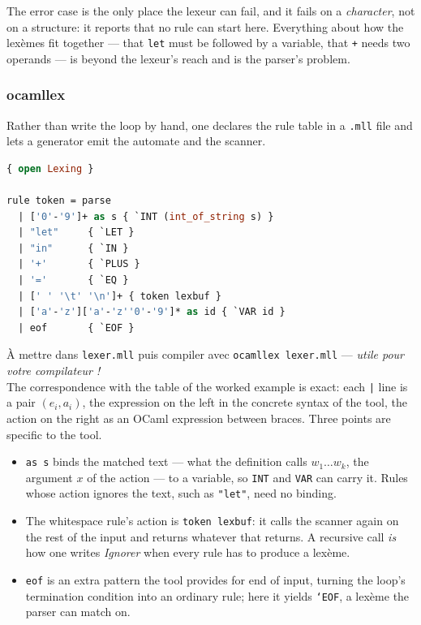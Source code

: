 \begin{remark}
  The error case is the only place the lexeur can fail, and it fails on a
  \emph{character}, not on a structure: it reports that no rule can start here.
  Everything about how the lexèmes fit together --- that \texttt{let} must be
  followed by a variable, that \texttt{+} needs two operands --- is beyond the
  lexeur's reach and is the parser's problem.
\end{remark}

\subsubsection{ocamllex}
Rather than write the loop by hand, one declares the rule table in a
\texttt{.mll} file and lets a generator emit the automate and the scanner.

\begin{lstlisting}[language=Caml]
{ open Lexing }

rule token = parse
  | ['0'-'9']+ as s { `INT (int_of_string s) }
  | "let"     { `LET }
  | "in"      { `IN }
  | '+'       { `PLUS }
  | '='       { `EQ }
  | [' ' '\t' '\n']+ { token lexbuf }
  | ['a'-'z']['a'-'z''0'-'9']* as id { `VAR id }
  | eof       { `EOF }
\end{lstlisting}

À mettre dans \texttt{lexer.mll} puis compiler avec \texttt{ocamllex lexer.mll}
--- \emph{utile pour votre compilateur !}\\

The correspondence with the table of the worked example is exact: each
\texttt{|} line is a pair $(e_i, a_i)$, the expression on the left in the
concrete syntax of the tool, the action on the right as an OCaml expression
between braces. Three points are specific to the tool.

\begin{itemize}
  \item \verb|as s| binds the matched text --- what the definition calls
    $w_1 \ldots w_k$, the argument $x$ of the action --- to a variable, so
    \texttt{INT} and \texttt{VAR} can carry it. Rules whose action ignores the
    text, such as \texttt{"let"}, need no binding.
  \item The whitespace rule's action is \texttt{token lexbuf}: it calls the
    scanner again on the rest of the input and returns whatever that returns.
    A recursive call \emph{is} how one writes \emph{Ignorer} when every rule has
    to produce a lexème.
  \item \texttt{eof} is an extra pattern the tool provides for end of input,
    turning the loop's termination condition into an ordinary rule; here it
    yields \texttt{`EOF}, a lexème the parser can match on.
\end{itemize}

